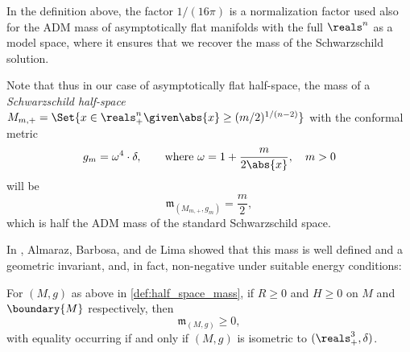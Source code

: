 \documentclass[titlepage,numbers=noenddot,headinclude,oneside,%
footinclude=true,cleardoublepage=empty,%
BCOR=5mm,paper=a4,fontsize=11pt,%
english,%
]{scrartcl}
\newcommand{\mass}[2]{\mathfrak{m}_{(#1,#2)}} %
\begin{document}
\begin{remark}\label{rem:mass_normalization}
    In the definition above, the factor \( 1/(16\pi) \)  is a normalization factor used also for the ADM mass of asymptotically flat manifolds with the full \( \reals^n \) as a model space, where it ensures that we recover the mass of the Schwarzschild solution. 
    
    Note that thus in our case of asymptotically flat half-space, the mass of a \emph{Schwarzschild half-space} \( M_{m,+}=\Set{x\in \reals^n_+\given \abs{x}\geq(m/2)^{1/(n-2)}} \) with the conformal metric
    \begin{equation*}
        g_m=\omega^4 \cdot \delta,\qquad \text{where } \omega=1+\frac{m}{2\abs{x}},\quad m>0
    \end{equation*}
    will be
    \begin{equation*}
        \mass{M_{m,+}}{g_m}=\frac{m}{2},
    \end{equation*}
    which is half the ADM mass of the standard Schwarzschild space.
\end{remark}
In \cite{almarazPositiveMassTheorem2016}, Almaraz, Barbosa, and de Lima showed that this mass is well defined and a geometric invariant, and, in fact, non-negative under suitable energy conditions:
\begin{theorem}\label{thm:positive_mass_theorem_for_half_spaces}
    For \( (M,g) \) as above in \cref{def:half_space_mass}, if \( R\geq 0 \) and \( H\geq 0 \) on \( M \) and \( \boundary{M} \) respectively, then
    \begin{equation*}
        \mass{M}{g}\geq 0,
    \end{equation*}  
    with equality occurring if and only if \( (M,g) \) is isometric to \( (\reals^3_+,\delta) \).
\end{theorem}
\end{document}
